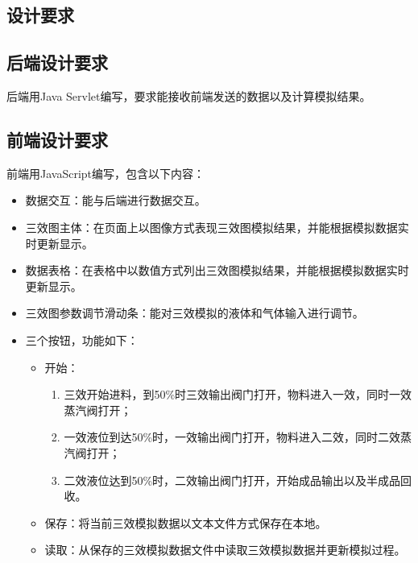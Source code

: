 \documentclass[a4paper]{ctexart}
\begin{document}
\tableofcontents %
\newpage

\songti{}
\begin{spacing}{1.25}%
\section{设计要求}

\subsection{后端设计要求}
后端用Java Servlet编写，要求能接收前端发送的数据以及计算模拟结果。

\subsection{前端设计要求}\label{subsection:前端设计要求}
前端用JavaScript编写，包含以下内容：

\begin{itemize}
	\item 数据交互：能与后端进行数据交互。
	\item 三效图主体：在页面上以图像方式表现三效图模拟结果，并能根据模拟数据实时更新显示。
	\item 数据表格：在表格中以数值方式列出三效图模拟结果，并能根据模拟数据实时更新显示。
	\item 三效图参数调节滑动条：能对三效模拟的液体和气体输入进行调节。
	\item 三个按钮，功能如下：
	\begin{itemize}
		\item 开始：
		\begin{enumerate}
			\item 三效开始进料，到50\%时三效输出阀门打开，物料进入一效，同时一效蒸汽阀打开；
			\item 一效液位到达50\%时，一效输出阀门打开，物料进入二效，同时二效蒸汽阀打开；
			\item 二效液位达到50\%时，二效输出阀门打开，开始成品输出以及半成品回收。
		\end{enumerate}
	\item 保存：将当前三效模拟数据以文本文件方式保存在本地。
	\item 读取：从保存的三效模拟数据文件中读取三效模拟数据并更新模拟过程。
	\end{itemize}
\end{itemize}


\end{spacing}
\end{document}
